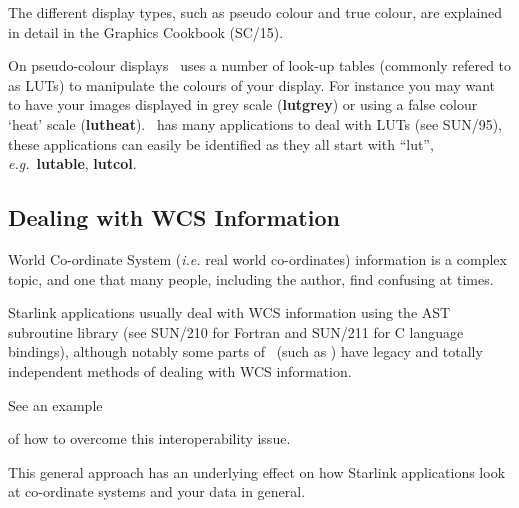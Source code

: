 \documentclass[twoside,11pt]{article}
\newcommand{\htmlref}[2]{#1}
\newcommand{\xref}[3]{#1}
\newcommand{\xlabel}[1]{}
\begin{document}
\begin{\htmlonly}
{The different display types, such as \xref{pseudo
colour}{sc15}{sc15_pseudo} and \xref{true colour}{sc15}{sc15_true},
are explained in detail in the \xref{Graphics Cookbook}{sc15}{} (SC/15).

On \xref{pseudo-colour displays}{sc15}{sc15_pseudo} \KAPPA\ uses a
number of \xref{look-up tables}{sun95}{se_lookuptables} (commonly
refered to as LUTs) to manipulate the colours of your display.  For
instance you may want to have your images displayed in grey scale
(\xref{{\bf lutgrey}}{sun95}{LUTGREY}) or using a false colour `heat'
scale (\xref{{\bf lutheat}}{sun95}{LUTHEAT}).  \KAPPA\ has many applications to
deal with LUTs (see \xref{SUN/95}{sun95}{}), these applications can
easily be identified as they all start with ``lut'', \emph{e.g.}\
\xref{{\bf lutable}}{sun95}{LUTABLE}, \xref{{\bf lutcol}}{sun95}{LUTCOL}.

\subsection{\xlabel{sc16_wcs}Dealing with WCS Information\label{sc16_wcs}}

\xref{World Co-ordinate System}{sun95}{se_wcsuse} (\emph{i.e.} real
world co-ordinates) information is a complex topic, and one that many people,
including the author, find confusing at times.

Starlink applications usually deal with WCS information using the
\xref{\footnotesize{AST}\normalsize}{sun210}{} subroutine library (see
SUN/210 for Fortran and \xref{SUN/211}{sun211}{} for C language
bindings), although notably some parts of \FIGARO\ (such as \SPECDRE)
have legacy and totally independent methods of dealing with WCS
information. 
\begin{htmlonly}
See \htmlref{an example}{sc16_wcs2axis}
\end{htmlonly} 
of how to overcome this interoperability issue.

This general approach has an underlying effect on how
Starlink applications look at co-ordinate systems and your data in
general.

}
\end{\htmlonly}
\end{document}
